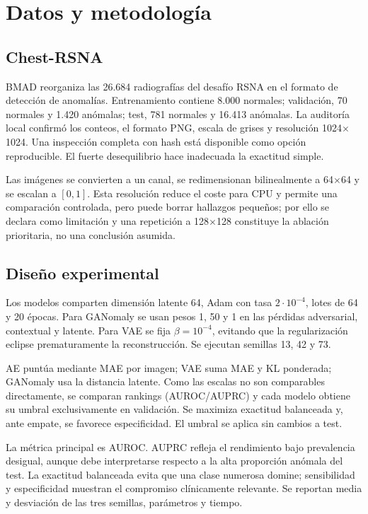 \section{Datos y metodología}

\subsection{Chest-RSNA}

BMAD reorganiza las 26.684 radiografías del desafío RSNA en el formato de
detección de anomalías. Entrenamiento contiene 8.000 normales; validación, 70
normales y 1.420 anómalas; test, 781 normales y 16.413 anómalas. La auditoría
local confirmó los conteos, el formato PNG, escala de grises y resolución
1024$\times$1024. Una inspección completa con hash está disponible como opción
reproducible. El fuerte desequilibrio hace inadecuada la exactitud simple.

Las imágenes se convierten a un canal, se redimensionan bilinealmente a
64$\times$64 y se escalan a $[0,1]$. Esta resolución reduce el coste para CPU y
permite una comparación controlada, pero puede borrar hallazgos pequeños; por
ello se declara como limitación y una repetición a 128$\times$128 constituye la
ablación prioritaria, no una conclusión asumida.

\subsection{Diseño experimental}

Los modelos comparten dimensión latente 64, Adam con tasa $2\cdot10^{-4}$,
lotes de 64 y 20 épocas. Para GANomaly se usan pesos 1, 50 y 1 en las pérdidas
adversarial, contextual y latente. Para VAE se fija $\beta=10^{-4}$, evitando que
la regularización eclipse prematuramente la reconstrucción. Se ejecutan semillas
13, 42 y 73.

AE puntúa mediante MAE por imagen; VAE suma MAE y KL ponderada; GANomaly usa la
distancia latente. Como las escalas no son comparables directamente, se comparan
rankings (AUROC/AUPRC) y cada modelo obtiene su umbral exclusivamente en
validación. Se maximiza exactitud balanceada y, ante empate, se favorece
especificidad. El umbral se aplica sin cambios a test.

La métrica principal es AUROC. AUPRC refleja el rendimiento bajo prevalencia
desigual, aunque debe interpretarse respecto a la alta proporción anómala del
test. La exactitud balanceada evita que una clase numerosa domine; sensibilidad
y especificidad muestran el compromiso clínicamente relevante. Se reportan
media y desviación de las tres semillas, parámetros y tiempo.

